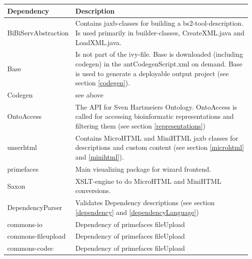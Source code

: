 \documentclass[a4paper,10pt]{book}
\begin{document}
\begin{tabularx}{\textwidth}{lX}
\hline
\textbf{Dependency} & \textbf{Description}\\ [0.1cm]
\hline
BiBiServAbstraction & Contains jaxb-classes for building a bs2-tool-description. Is used primarily in builder-classes, CreateXML.java and LoadXML.java.\\ [0.1cm]
\hline
Base & Is not part of the ivy-file. Base is downloaded (including codegen) in the antCodegenScript.xml on demand. Base is used to generate a deployable output project (see section \ref{codegen}). \\ [0.1cm]
\hline
Codegen & see above \\ [0.1cm]
\hline
OntoAccess & The API for Sven Hartmeiers Ontology. OntoAccess is called for accessing bioinformatic representations and filtering them (see section \ref{representations})  \\ [0.1cm]
\hline
unserhtml & Contains MicroHTML and MiniHTML jaxb classes for descriptions and custom content (see section \ref{microhtml} and \ref{minihtml}). \\ [0.1cm]
\hline
primefaces & Main visualizing package for wizard frontend. \\ [0.1cm]
\hline
Saxon & XSLT-engine to do MicroHTML and MiniHTML conversions. \\ [0.1cm]
\hline
DependencyParser & Validates Dependency descriptions (see section \ref{dependency} and \ref{dependencyLanguage}) \\ [0.1cm]
\hline
commons-io & Dependency of primefaces fileUpload \\ [0.1cm]
\hline
commons-fileupload & Dependency of primefaces fileUpload \\ [0.1cm]
\hline
commons-codec & Dependency of primefaces fileUpload \\ [0.1cm]
\end{tabularx}
\end{document}
